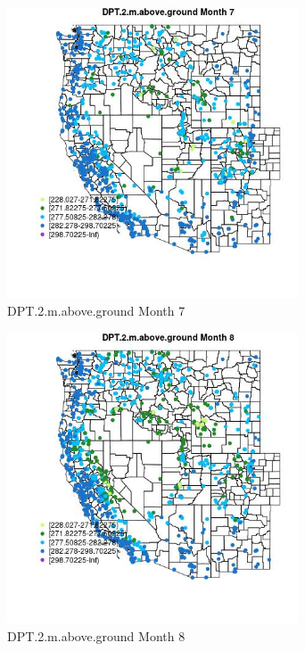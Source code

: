 \begin{figure} 
\centering  
\includegraphics[width=0.77\textwidth]{Code_Outputs/Report_ML_input_PM25_Step4_part_f_de_duplicated_aveswNAs_MapObsMo7DPT2maboveground.jpg} 
\caption{\label{fig:Report_ML_input_PM25_Step4_part_f_de_duplicated_aveswNAsMapObsMo7DPT2maboveground}DPT.2.m.above.ground Month 7} 
\end{figure} 
 

\begin{figure} 
\centering  
\includegraphics[width=0.77\textwidth]{Code_Outputs/Report_ML_input_PM25_Step4_part_f_de_duplicated_aveswNAs_MapObsMo8DPT2maboveground.jpg} 
\caption{\label{fig:Report_ML_input_PM25_Step4_part_f_de_duplicated_aveswNAsMapObsMo8DPT2maboveground}DPT.2.m.above.ground Month 8} 
\end{figure} 
 


